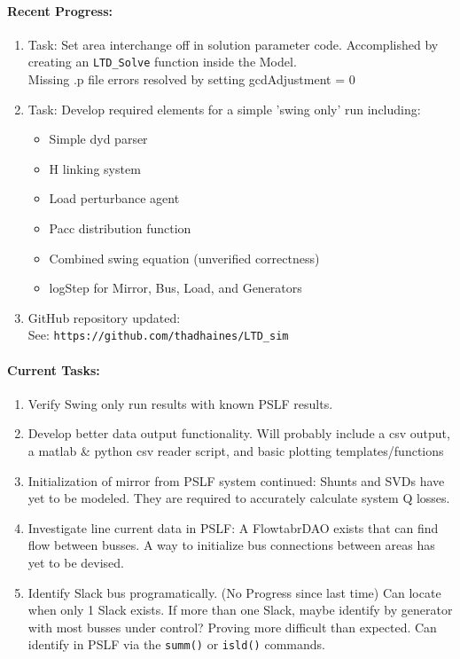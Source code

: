 \documentclass[12pt]{article}
\begin{document}
	\paragraph{Recent Progress:}
	\begin{enumerate}
		\item Task: Set area interchange off in solution parameter code.
		\subitem Accomplished by creating an \verb|LTD_Solve| function inside the Model. \\
		Missing .p file errors resolved by setting gcdAdjustment = 0
		
		\item Task: Develop required elements for a simple 'swing only' run including:
		\begin{itemize}
			\item Simple dyd parser
			\item H linking system
			\item Load perturbance agent
			\item Pacc distribution function
			\item Combined swing equation (unverified correctness)
			\item logStep for Mirror, Bus, Load, and Generators
		\end{itemize}
		
		\item GitHub repository updated:\\
		See: \verb|https://github.com/thadhaines/LTD_sim|
		
	\end{enumerate}
	\paragraph{Current Tasks:}
	\begin{enumerate}
		\item Verify Swing only run results with known PSLF results.
		
		\item Develop better data output functionality.
		\subitem Will probably include a csv output, a matlab \& python csv reader script, and basic plotting templates/functions
		
		\item Initialization of mirror from PSLF system continued:
		\subitem Shunts and SVDs have yet to be modeled. They are required to accurately calculate system Q losses.
		
		\item Investigate line current data in PSLF:
		\subitem A FlowtabrDAO exists that can find flow between busses. A way to initialize bus connections between areas has yet to be devised.
		
		\item Identify Slack bus programatically. (No Progress since last time)
		\subitem Can locate when only 1 Slack exists. If more than one Slack, maybe identify by generator with most busses under control? Proving more difficult than expected. Can identify in PSLF via the \verb|summ()| or \verb|isld()| commands. 
		
	\end{enumerate}
\end{document}
